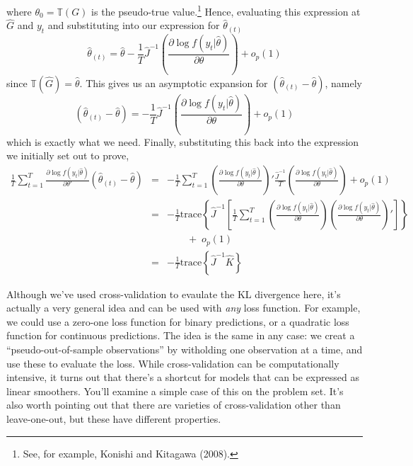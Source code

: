 \documentclass[12pt]{article}
\theoremstyle{definition}
\begin{document}
where $\theta_0 = \mathbb{T}(G)$ is the pseudo-true value.\footnote{See, for example, Konishi and Kitagawa (2008).} Hence, evaluating this expression at $\widehat{G}$ and $y_t$ and substituting into our expression for $\widehat{\theta}_{(t)}$
	$$\widehat{\theta}_{(t)} = \widehat{\theta} - \frac{1}{T}\widehat{J}^{-1} \left(\frac{\partial \log f(y_t|\widehat{\theta})}{\partial \theta}\right) + o_p(1)$$
since $\mathbb{T}(\widehat{G}) = \widehat{\theta}$. This gives us an asymptotic expansion for $\left(\widehat{\theta}_{(t)} - \widehat{\theta}\right)$, namely 
$$\left(\widehat{\theta}_{(t)} - \widehat{\theta}\right) =  - \frac{1}{T}\widehat{J}^{-1} \left(\frac{\partial \log f(y_t|\widehat{\theta})}{\partial \theta}\right) + o_p(1)$$
which is exactly what we need. Finally, substituting this back into the expression we initially set out to prove,
\begin{eqnarray*}
	\frac{1}{T}\sum_{t=1}^T \frac{\partial \log f(y_t|\widehat{\theta})}{\partial \theta'}\left(\widehat{\theta}_{(t)} - \widehat{\theta} \right) &=& -\frac{1}{T}\sum_{t=1}^T \left(\frac{\partial \log f(y_t|\widehat{\theta})}{\partial \theta}\right)' \frac{\widehat{J}^{-1}}{T}\left(\frac{\partial \log f(y_t|\widehat{\theta})}{\partial \theta}\right) + o_p(1)\\
		&=& -\frac{1}{T}\mbox{trace}\left\{\widehat{J}^{-1}\left[\frac{1}{T}\sum_{t=1}^T \left(\frac{\partial \log f(y_t|\widehat{\theta})}{\partial \theta}\right) \left(\frac{\partial \log f(y_t|\widehat{\theta})}{\partial \theta}\right) '\right]\right\}\\
		&&\quad \quad + \; o_p(1)\\
		&=&-\frac{1}{T}\mbox{trace}\left\{\widehat{J}^{-1} \widehat{K} \right\}
\end{eqnarray*}

Although we've used cross-validation to evaulate the KL divergence here, it's actually a very general idea and can be used with \emph{any} loss function. For example, we could use a zero-one loss function for binary predictions, or a quadratic loss function for continuous predictions. The idea is the same in any case: we creat a ``pseudo-out-of-sample observations'' by witholding one observation at a time, and use these to evaluate the loss. While cross-validation can be computationally intensive, it turns out that there's a shortcut for models that can be expressed as linear smoothers. You'll examine a simple case of this on the problem set. It's also worth pointing out that there are varieties of cross-validation other than leave-one-out, but these have different properties. 
\end{document}
